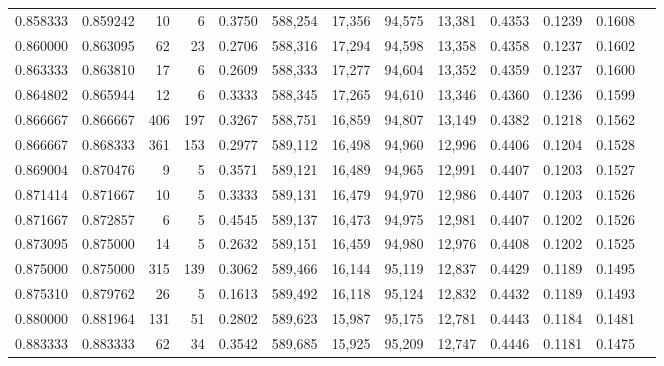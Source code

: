 \begin{tabular}{rrrrrrrrrrrrr}
0.858333 & 0.859242 &     10 &      6 &                                     0.3750 & 588,254 &  17,356 &  94,575 &  13,381 & 0.4353 & 0.1239 & 0.1608 \\
0.860000 & 0.863095 &     62 &     23 &                                     0.2706 & 588,316 &  17,294 &  94,598 &  13,358 & 0.4358 & 0.1237 & 0.1602 \\
0.863333 & 0.863810 &     17 &      6 &                                     0.2609 & 588,333 &  17,277 &  94,604 &  13,352 & 0.4359 & 0.1237 & 0.1600 \\
0.864802 & 0.865944 &     12 &      6 &                                     0.3333 & 588,345 &  17,265 &  94,610 &  13,346 & 0.4360 & 0.1236 & 0.1599 \\
0.866667 & 0.866667 &    406 &    197 &                                     0.3267 & 588,751 &  16,859 &  94,807 &  13,149 & 0.4382 & 0.1218 & 0.1562 \\
0.866667 & 0.868333 &    361 &    153 &                                     0.2977 & 589,112 &  16,498 &  94,960 &  12,996 & 0.4406 & 0.1204 & 0.1528 \\
0.869004 & 0.870476 &      9 &      5 &                                     0.3571 & 589,121 &  16,489 &  94,965 &  12,991 & 0.4407 & 0.1203 & 0.1527 \\
0.871414 & 0.871667 &     10 &      5 &                                     0.3333 & 589,131 &  16,479 &  94,970 &  12,986 & 0.4407 & 0.1203 & 0.1526 \\
0.871667 & 0.872857 &      6 &      5 &                                     0.4545 & 589,137 &  16,473 &  94,975 &  12,981 & 0.4407 & 0.1202 & 0.1526 \\
0.873095 & 0.875000 &     14 &      5 &                                     0.2632 & 589,151 &  16,459 &  94,980 &  12,976 & 0.4408 & 0.1202 & 0.1525 \\
0.875000 & 0.875000 &    315 &    139 &                                     0.3062 & 589,466 &  16,144 &  95,119 &  12,837 & 0.4429 & 0.1189 & 0.1495 \\
0.875310 & 0.879762 &     26 &      5 &                                     0.1613 & 589,492 &  16,118 &  95,124 &  12,832 & 0.4432 & 0.1189 & 0.1493 \\
0.880000 & 0.881964 &    131 &     51 &                                     0.2802 & 589,623 &  15,987 &  95,175 &  12,781 & 0.4443 & 0.1184 & 0.1481 \\
0.883333 & 0.883333 &     62 &     34 &                                     0.3542 & 589,685 &  15,925 &  95,209 &  12,747 & 0.4446 & 0.1181 & 0.1475 \\

\end{tabular}
